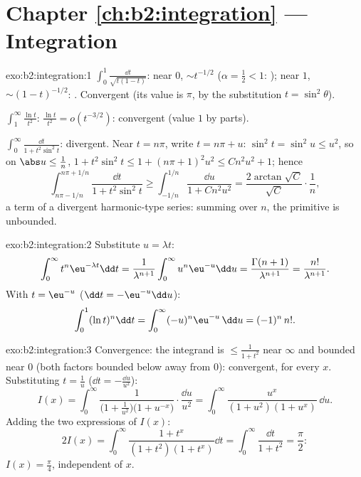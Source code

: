 \section*{Chapter \ref{ch:b2:integration} --- Integration}

\begin{solution}{exo:b2:integration:1}
$\int_0^1 \frac{\dd t}{\sqrt{t(1-t)}}$: near $0$, $\sim t^{-1/2}$
($\alpha = \frac12 < 1$: ); near $1$, $\sim
(1-t)^{-1/2}$: . Convergent (its value is $\pi$, by the
substitution $t = \sin^2\theta$).

$\int_1^\infty \frac{\ln t}{t^2}$: $\frac{\ln t}{t^2} = o(t^{-3/2})$:
convergent (value $1$ by parts).

$\int_0^\infty \frac{\dd t}{1 + t^2\sin^2 t}$: divergent. Near $t =
n\pi$, write $t = n\pi + u$: $\sin^2 t = \sin^2 u \leq u^2$, so on
$\abs u \leq \frac{1}{n}$, $1 + t^2\sin^2 t \leq 1 + (n\pi +
1)^2u^2 \leq C n^2 u^2 + 1$; hence
\[
\int_{n\pi - 1/n}^{n\pi + 1/n} \frac{\dd t}{1 + t^2\sin^2 t}
\geq \int_{-1/n}^{1/n} \frac{\dd u}{1 + Cn^2u^2}
= \frac{2\arctan\sqrt C}{\sqrt C}\cdot\frac{1}{n} ,
\]
a term of a divergent harmonic-type series: summing over $n$, the
primitive is unbounded.
\end{solution}

\begin{solution}{exo:b2:integration:2}
Substitute $u = \lambda t$:
\[
\int_0^\infty t^n \eu^{-\lambda t}\dd t
= \frac{1}{\lambda^{n+1}}\int_0^\infty u^n\eu^{-u}\dd u
= \frac{\Gamma(n+1)}{\lambda^{n+1}} = \frac{n!}{\lambda^{n+1}} .
\]
With $t = \eu^{-u}$ ($\dd t = -\eu^{-u}\dd u$):
\[
\int_0^1 (\ln t)^n \dd t = \int_0^{\infty} (-u)^n \eu^{-u}\,\dd u
= (-1)^n\, n! .
\]
\end{solution}

\begin{solution}{exo:b2:integration:3}
Convergence: the integrand is $\leq \frac{1}{1+t^2}$ near $\infty$
and bounded near $0$ (both factors bounded below away from $0$):
 convergent, for every $x$. Substituting $t = \frac1u$
($\dd t = -\frac{\dd u}{u^2}$):
\[
I(x) = \int_0^\infty \frac{1}{\bigl(1 +
\frac1{u^2}\bigr)\bigl(1 + u^{-x}\bigr)}\cdot\frac{\dd u}{u^2}
= \int_0^\infty \frac{u^x}{(1 + u^2)(1 + u^x)}\,\dd u .
\]
Adding the two expressions of $I(x)$:
\[
2I(x) = \int_0^\infty \frac{1 + t^x}{(1+t^2)(1+t^x)}\dd t
= \int_0^\infty \frac{\dd t}{1 + t^2} = \frac{\pi}{2} :
\]
$I(x) = \frac\pi4$, independent of $x$.
\end{solution}

